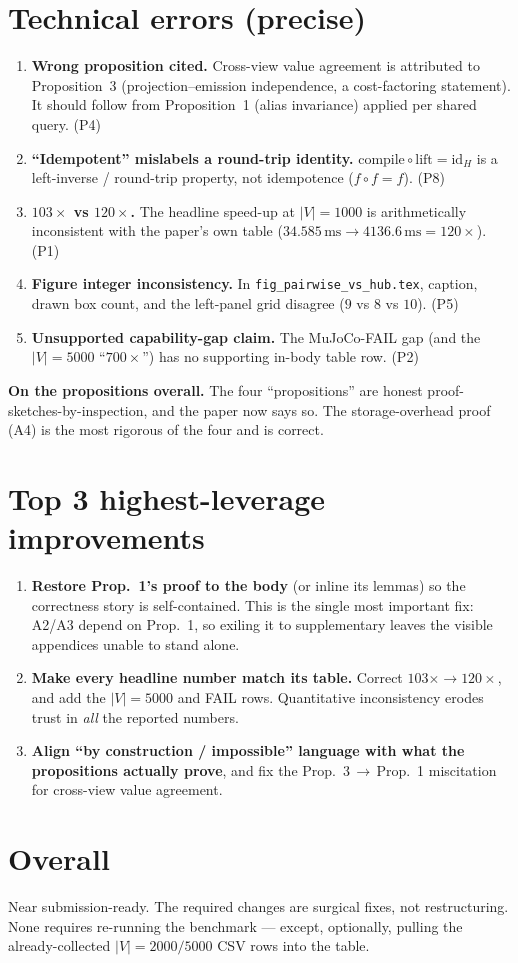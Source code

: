 \documentclass[11pt]{article}
\newcommand{\file}[1]{\texttt{#1}}
\begin{document}
\section{Technical errors (precise)}

\begin{enumerate}
  \item \textbf{Wrong proposition cited.} Cross-view value agreement is attributed to Proposition~3 (projection--emission independence, a cost-factoring statement). It should follow from Proposition~1 (alias invariance) applied per shared query. (P4)
  \item \textbf{``Idempotent'' mislabels a round-trip identity.} $\text{compile}\circ\text{lift}=\mathrm{id}_H$ is a left-inverse / round-trip property, not idempotence ($f\circ f=f$). (P8)
  \item \textbf{$103\times$ vs $120\times$.} The headline speed-up at $|V|{=}1000$ is arithmetically inconsistent with the paper's own table ($34.585\,\text{ms}\rightarrow 4136.6\,\text{ms} = 120\times$). (P1)
  \item \textbf{Figure integer inconsistency.} In \file{fig\_pairwise\_vs\_hub.tex}, caption, drawn box count, and the left-panel grid disagree ($9$ vs $8$ vs $10$). (P5)
  \item \textbf{Unsupported capability-gap claim.} The MuJoCo-FAIL gap (and the $|V|{=}5000$ ``$700\times$'') has no supporting in-body table row. (P2)
\end{enumerate}

\noindent\textbf{On the propositions overall.} The four ``propositions'' are honest proof-sketches-by-inspection, and the paper now says so. The storage-overhead proof (A4) is the most rigorous of the four and is correct.

\section{Top 3 highest-leverage improvements}

\begin{enumerate}
  \item \textbf{Restore Prop.~1's proof to the body} (or inline its lemmas) so the correctness story is self-contained. This is the single most important fix: A2/A3 depend on Prop.~1, so exiling it to supplementary leaves the visible appendices unable to stand alone.
  \item \textbf{Make every headline number match its table.} Correct $103\times \rightarrow 120\times$, and add the $|V|{=}5000$ and FAIL rows. Quantitative inconsistency erodes trust in \emph{all} the reported numbers.
  \item \textbf{Align ``by construction / impossible'' language with what the propositions actually prove}, and fix the Prop.~3\,$\rightarrow$\,Prop.~1 miscitation for cross-view value agreement.
\end{enumerate}

\section*{Overall}

Near submission-ready. The required changes are surgical fixes, not restructuring. None requires re-running the benchmark --- except, optionally, pulling the already-collected $|V|{=}2000/5000$ CSV rows into the table.
\end{document}
